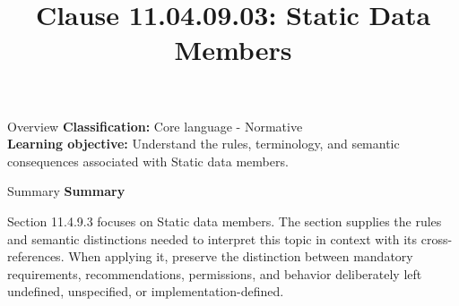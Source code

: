 \documentclass[10pt,letterpaper]{article}
\title{Clause 11.04.09.03: Static Data Members}
\author{}
\date{}
\begin{document}
\maketitle
\begin{CornellOverviewBox}{Overview}
\textbf{Classification:} Core language - Normative\\[2pt]
\textbf{Learning objective:} Understand the rules, terminology, and semantic consequences associated with Static data members.
\end{CornellOverviewBox}\begin{CornellSummaryBox}{Summary}
{\sffamily\bfseries\color{Accent} Summary}\par\vspace{3pt}Section 11.4.9.3 focuses on Static data members. The section supplies the rules and semantic distinctions needed to interpret this topic in context with its cross-references. When applying it, preserve the distinction between mandatory requirements, recommendations, permissions, and behavior deliberately left undefined, unspecified, or implementation-defined.
\end{CornellSummaryBox}
\end{document}
